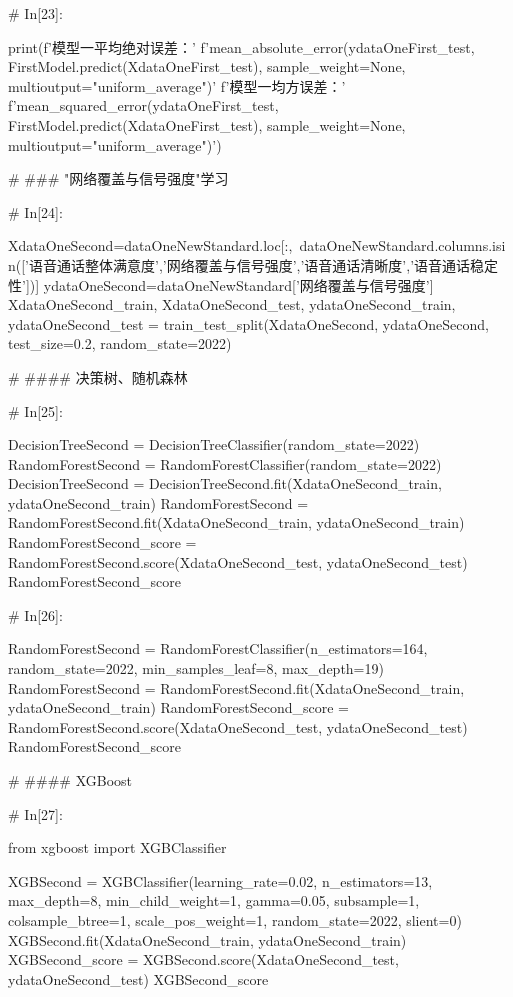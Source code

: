 \documentclass{MathorCupmodeling}
\begin{document}
\begin{python}
# In[23]:


print(f'模型一平均绝对误差：'
      f'{mean_absolute_error(ydataOneFirst_test, FirstModel.predict(XdataOneFirst_test), sample_weight=None, multioutput="uniform_average")}\n'
      f'模型一均方误差：'
      f'{mean_squared_error(ydataOneFirst_test, FirstModel.predict(XdataOneFirst_test), sample_weight=None, multioutput="uniform_average")}')


# ### "网络覆盖与信号强度"学习

# In[24]:


XdataOneSecond=dataOneNewStandard.loc[:,~dataOneNewStandard.columns.isin(['语音通话整体满意度','网络覆盖与信号强度','语音通话清晰度','语音通话稳定性'])]
ydataOneSecond=dataOneNewStandard['网络覆盖与信号强度']
XdataOneSecond_train, XdataOneSecond_test, ydataOneSecond_train, ydataOneSecond_test = train_test_split(XdataOneSecond, ydataOneSecond, test_size=0.2, random_state=2022)


# #### 决策树、随机森林

# In[25]:


DecisionTreeSecond = DecisionTreeClassifier(random_state=2022)
RandomForestSecond = RandomForestClassifier(random_state=2022)
DecisionTreeSecond = DecisionTreeSecond.fit(XdataOneSecond_train, ydataOneSecond_train)
RandomForestSecond = RandomForestSecond.fit(XdataOneSecond_train, ydataOneSecond_train)
RandomForestSecond_score = RandomForestSecond.score(XdataOneSecond_test, ydataOneSecond_test)
RandomForestSecond_score


# In[26]:


RandomForestSecond = RandomForestClassifier(n_estimators=164, random_state=2022, min_samples_leaf=8, max_depth=19)
RandomForestSecond = RandomForestSecond.fit(XdataOneSecond_train, ydataOneSecond_train)
RandomForestSecond_score = RandomForestSecond.score(XdataOneSecond_test, ydataOneSecond_test)
RandomForestSecond_score


# #### XGBoost

# In[27]:


from xgboost import XGBClassifier

XGBSecond = XGBClassifier(learning_rate=0.02,
                          n_estimators=13,
                          max_depth=8,
                          min_child_weight=1,
                          gamma=0.05,
                          subsample=1,
                          colsample_btree=1,
                          scale_pos_weight=1,
                          random_state=2022,
                          slient=0)
XGBSecond.fit(XdataOneSecond_train, ydataOneSecond_train)
XGBSecond_score = XGBSecond.score(XdataOneSecond_test, ydataOneSecond_test)
XGBSecond_score



\end{python}
\end{document}

